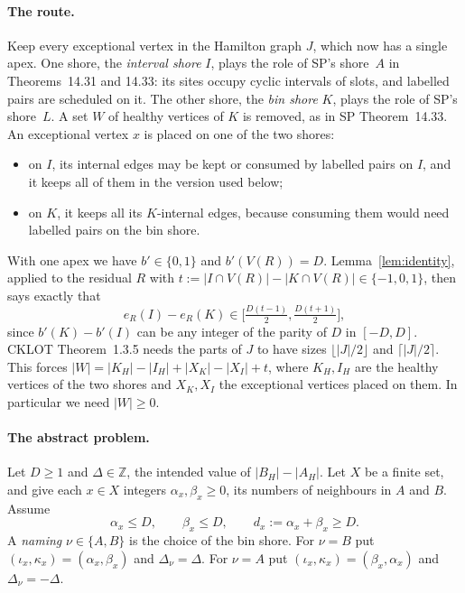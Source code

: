 \documentclass[11pt]{article}
\theoremstyle{definition}
\begin{document}
\paragraph{The route.} Keep every exceptional vertex in the Hamilton graph $J$, which now has a single apex. One shore, the \emph{interval shore} $I$, plays the role of SP's shore~$A$ in Theorems~14.31 and 14.33: its sites occupy cyclic intervals of slots, and labelled pairs are scheduled on it. The other shore, the \emph{bin shore} $K$, plays the role of SP's shore~$L$. A set $W$ of healthy vertices of $K$ is removed, as in SP Theorem~14.33. An exceptional vertex $x$ is placed on one of the two shores:
\begin{itemize}[nosep]
\item on $I$, its internal edges may be kept or consumed by labelled pairs on $I$, and it keeps all of them in the version used below;
\item on $K$, it keeps all its $K$-internal edges, because consuming them would need labelled pairs on the bin shore.
\end{itemize}
With one apex we have $b'\in\{0,1\}$ and $b'(V(R))=D$. Lemma~\ref{lem:identity}, applied to the residual $R$ with $t:=|I\cap V(R)|-|K\cap V(R)|\in\{-1,0,1\}$, then says exactly that
\begin{equation}\label{eq:window}
e_R(I)-e_R(K)\in\bigl[\tfrac{D(t-1)}2,\tfrac{D(t+1)}2\bigr],
\end{equation}
since $b'(K)-b'(I)$ can be any integer of the parity of $D$ in $[-D,D]$. CKLOT Theorem~1.3.5 needs the parts of $J$ to have sizes $\lfloor|J|/2\rfloor$ and $\lceil|J|/2\rceil$. This forces $|W|=|K_H|-|I_H|+|X_K|-|X_I|+t$, where $K_H,I_H$ are the healthy vertices of the two shores and $X_K,X_I$ the exceptional vertices placed on them. In particular we need $|W|\ge0$.

\paragraph{The abstract problem.} Let $D\ge1$ and $\Delta\in\mathbb Z$, the intended value of $|B_H|-|A_H|$. Let $X$ be a finite set, and give each $x\in X$ integers $\alpha_x,\beta_x\ge0$, its numbers of neighbours in $A$ and $B$. Assume
\begin{equation}\tag{B1}\label{eq:B1}
\alpha_x\le D,\qquad\beta_x\le D,\qquad d_x:=\alpha_x+\beta_x\ge D .
\end{equation}
A \emph{naming} $\nu\in\{A,B\}$ is the choice of the bin shore. For $\nu=B$ put $(\iota_x,\kappa_x)=(\alpha_x,\beta_x)$ and $\Delta_\nu=\Delta$. For $\nu=A$ put $(\iota_x,\kappa_x)=(\beta_x,\alpha_x)$ and $\Delta_\nu=-\Delta$.
\end{document}
